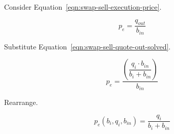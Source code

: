 \documentclass[table, twocolumn]{article}
\begin{document}
Consider Equation~\ref{eqn:swap-sell-execution-price}.

\begin{equation}
	p_e = \frac{q_{out}}{b_{in}} \nonumber
\end{equation}

Substitute Equation~\ref{eqn:swap-sell-quote-out-solved}.

\begin{equation}
	p_e = \dfrac{\left(\dfrac{q_i \cdot b_{in}}{b_i + b_{in}}\right)}{b_{in}} \nonumber
\end{equation}

Rearrange.

\begin{equation}
	p_e (b_i, q_i, b_{in}) = \frac{q_i}{b_i + b_{in}} \nonumber
\end{equation}
\end{document}

